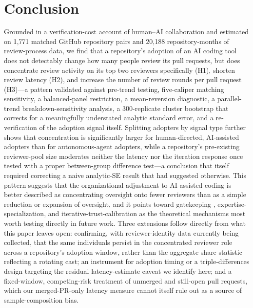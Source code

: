 \documentclass[12pt]{article}
\begin{document}
\section{Conclusion}

Grounded in a verification-cost account of human--AI collaboration and
estimated on 1,771 matched GitHub repository pairs and 20,188
repository-months of review-process data, we find that a repository's
adoption of an AI coding tool does not detectably change how many people
review its pull requests, but does concentrate review activity on its
top two reviewers specifically (H1), shorten review latency (H2), and
increase the number of review rounds per pull request (H3)---a pattern
validated against pre-trend testing, five-caliper matching sensitivity, a
balanced-panel restriction, a mean-reversion diagnostic, a parallel-trend
breakdown-sensitivity analysis, a 300-replicate cluster bootstrap that
corrects for a meaningfully understated analytic standard error, and a
re-verification of the adoption signal itself. Splitting adopters by
signal type further shows that concentration is significantly larger for
human-directed, AI-assisted adopters than for autonomous-agent adopters,
while a repository's pre-existing reviewer-pool size moderates neither
the latency nor the iteration response once tested with a proper
between-group difference test---a conclusion that itself required
correcting a naive analytic-SE result that had suggested otherwise. This
pattern suggests that the organizational adjustment to AI-assisted coding
is better described as concentrating oversight onto fewer reviewers than
as a simple reduction or expansion of oversight, and
it points toward gatekeeping \cite{allen1977gatekeepers},
expertise-specialization, and
iterative-trust-calibration as the theoretical mechanisms most worth
testing directly in future work. Three extensions follow directly from
what this paper leaves open: confirming, with reviewer-identity data
currently being collected, that the same individuals persist in the
concentrated reviewer role across a repository's adoption window, rather
than the aggregate share statistic reflecting a rotating cast; an
instrument for adoption timing or a triple-differences design targeting
the residual latency-estimate caveat we identify here; and a fixed-window,
competing-risk treatment of unmerged and still-open pull requests, which
our merged-PR-only latency measure cannot itself rule out as a source of
sample-composition bias.



\end{document}
